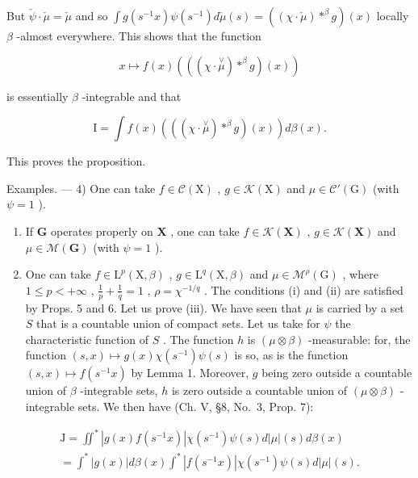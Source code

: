 But \(\check{\psi} \cdot \check{\mu} = \check{\mu}\) and so \(\int g(s^{-1}x)\psi(s^{-1})d\check{\mu}(s) = ((\chi \cdot \check{\mu}) *^{\beta}g)(x)\) locally \(\beta\) -almost everywhere. This shows that the function

\[
x \mapsto f (x) \left(\left((\chi \cdot \stackrel {\vee} {\mu}) * ^ {\beta} g\right) (x)\right)
\]

is essentially \(\beta\) -integrable and that

\[
\mathrm{I} = \int f (x) \left(\left(\left(\chi \cdot \stackrel {\vee} {\mu}\right) * ^ {\beta} g\right) (x)\right) d \beta (x).
\]

This proves the proposition.

Examples. --- 4) One can take \(f \in \mathcal{C}(\mathrm{X})\) , \(g \in \mathcal{K}(\mathrm{X})\) and \(\mu \in \mathcal{C}'(\mathrm{G})\) (with \(\psi = 1\) ).

\begin{enumerate}
\def\labelenumi{\arabic{enumi})}
\setcounter{enumi}{4}
\item
  If \(\mathbf{G}\) operates properly on \(\mathbf{X}\) , one can take \(f \in \mathcal{K}(\mathbf{X})\) , \(g \in \mathcal{K}(\mathbf{X})\) and \(\mu \in \mathcal{M}(\mathbf{G})\) (with \(\psi = 1\) ).
\item
  One can take \(f \in \mathrm{L}^p(\mathrm{X},\beta)\) , \(g \in \mathrm{L}^q(\mathrm{X},\beta)\) and \(\mu \in \mathcal{M}^\rho(\mathrm{G})\) , where \(1 \leqslant p < +\infty\) , \(\frac{1}{p} + \frac{1}{q} = 1\) , \(\rho = \chi^{-1/q}\) . The conditions (i) and (ii) are satisfied by Props. 5 and 6. Let us prove (iii). We have seen that \(\mu\) is carried by a set \(S\) that is a countable union of compact sets. Let us take for \(\psi\) the characteristic function of \(S\) . The function \(h\) is \((\mu \otimes \beta)\) -measurable: for, the function \((s,x) \mapsto g(x)\chi(s^{-1})\psi(s)\) is so, as is the function \((s,x) \mapsto f(s^{-1}x)\) by Lemma 1. Moreover, \(g\) being zero outside a countable union of \(\beta\) -integrable sets, \(h\) is zero outside a countable union of \((\mu \otimes \beta)\) -integrable sets. We then have (Ch. V, §8, No.~3, Prop. 7):
\end{enumerate}

\[
\begin{array}{l} \mathrm{J} = \iint^ {*} | g (x) f (s ^ {- 1} x) | \chi (s ^ {- 1}) \psi (s) d | \mu | (s) d \beta (x) \\ = \int^ {*} | g (x) | d \beta (x) \int^ {*} | f (s ^ {- 1} x) | \chi (s ^ {- 1}) \psi (s) d | \mu | (s). \end{array}\tag{9}
\]

